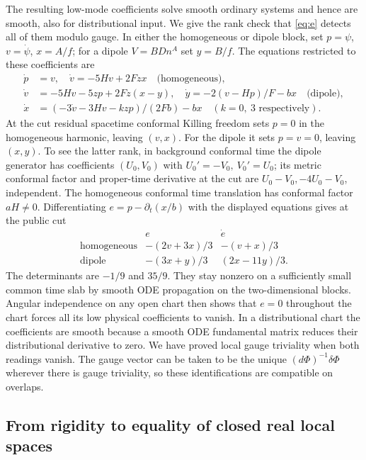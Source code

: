 \documentclass[11pt]{article}
\begin{document}
The resulting low-mode coefficients solve smooth ordinary systems and hence are smooth, also for distributional input. We give the rank check that \eqref{eq:e} detects all of them modulo gauge. In either the homogeneous or dipole block, set \(p=\psi\), \(v=\dot\psi\), \(x=A/f\); for a dipole \(V=B Dn^A\) set \(y=B/f\). The equations restricted to these coefficients are
\begin{align*}
 \dot p&=v,\quad
 \dot v=-5Hv+2Fzx\quad\text{(homogeneous)},\\
 \dot v&=-5Hv-5zp+2Fz(x-y),\quad
 \dot y=-2(v-Hp)/F-bx\quad\text{(dipole)},\\
 \dot x&=(-3\dot v-3Hv-kzp)/(2Fb)-bx
     \quad(k=0,\ 3 \text{ respectively}).
\end{align*}
At the cut residual spacetime conformal Killing freedom sets \(p=0\) in the homogeneous harmonic, leaving \((v,x)\). For the dipole it sets \(p=v=0\), leaving \((x,y)\). To see the latter rank, in background conformal time the dipole generator has coefficients \((U_0,V_0)\) with \(U_0'=-V_0,\ V_0'=U_0\); its metric conformal factor and proper-time derivative at the cut are \(U_0-V_0,-4U_0-V_0\), independent. The homogeneous conformal time translation has conformal factor \(aH\ne0\). Differentiating \(e=p-\partial_t(x/b)\) with the displayed equations gives at the public cut
\[
\begin{array}{c|cc}
 & e & \dot e\\ \hline
 \text{homogeneous}&-(2v+3x)/3&-(v+x)/3\\
 \text{dipole}&-(3x+y)/3&(2x-11y)/3 .
\end{array}
\]
The determinants are \(-1/9\) and \(35/9\). They stay nonzero on a sufficiently small common time slab by smooth ODE propagation on the two-dimensional blocks. Angular independence on any open chart then shows that \(e=0\) throughout the chart forces all its low physical coefficients to vanish. In a distributional chart the coefficients are smooth because a smooth ODE fundamental matrix reduces their distributional derivative to zero. We have proved local gauge triviality when both readings vanish. The gauge vector can be taken to be the unique \((d\Phi)^{-1}\delta\Phi\) wherever there is gauge triviality, so these identifications are compatible on overlaps.

\subsection{From rigidity to equality of closed real local spaces}
\end{document}
